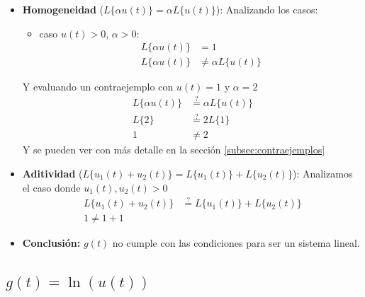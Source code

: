 \documentclass[12pt,a4paper]{article}
\begin{document}
\begin{itemize}
    \item \textbf{Homogeneidad} ($L\{\alpha u(t)\} = \alpha L\{u(t)\}$): Analizando los casos:
    \begin{itemize}
        \item caso $u(t) > 0$, $\alpha > 0$: 
        \begin{align*}
            L\{\alpha u(t)\} &=  1\\
            L\{\alpha u(t)\} &\neq \alpha L\{ u(t)\}
        \end{align*}
    \end{itemize}
    Y evaluando un contraejemplo con $u(t) = 1$ y $\alpha = 2$
    \begin{align*}
        L\{\alpha u(t)\} &\stackrel{?}{=} \alpha L\{ u(t)\}\\
        L\{2\} &\stackrel{?}{=} 2 L\{ 1\}\\
        1 &\neq 2
    \end{align*}
    Y se pueden ver con más detalle en la sección \ref{subsec:contraejemplos}
    \item \textbf{Aditividad} ($L\{u_1(t)+u_2(t)\}=L\{u_1(t)\}+ L\{u_2(t)\}$): Analizamos el caso donde $u_1(t),u_2(t) >0$
    \begin{align*}
        L\{u_1(t)+u_2(t)\} &\stackrel{?}{=} L\{u_1(t)\}+L\{u_2(t)\}\\
        1 \neq 1+1
    \end{align*}
    \item \textbf{Conclusión:} $g(t)$ no cumple con las condiciones para ser un sistema lineal.

\end{itemize}

\subsection{$g(t)=\ln(u(t))$}
\end{document}
